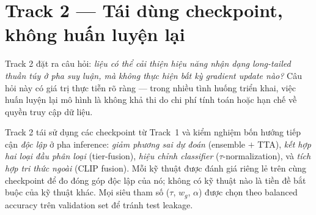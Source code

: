 

\section{Track 2 --- Tái dùng checkpoint, không huấn luyện lại}
\label{sec:track2}

Track 2 đặt ra câu hỏi: \emph{liệu có thể cải thiện hiệu năng nhận dạng long-tailed
thuần túy ở pha suy luận, mà không thực hiện bất kỳ gradient update nào?}
Câu hỏi này có giá trị thực tiễn rõ ràng --- trong nhiều tình huống triển khai,
việc huấn luyện lại mô hình là không khả thi do chi phí tính toán hoặc hạn chế
về quyền truy cập dữ liệu.
 
Track 2 tái sử dụng các checkpoint từ Track~1 và kiểm nghiệm bốn hướng tiếp cận
\emph{độc lập} ở pha inference:
\emph{giảm phương sai dự đoán} (ensemble $+$ TTA),
\emph{kết hợp hai loại đầu phân loại} (tier-fusion),
\emph{hiệu chỉnh classifier} ($\tau$-normalization),
và \emph{tích hợp tri thức ngoài} (CLIP fusion).
Mỗi kỹ thuật được đánh giá riêng lẻ trên cùng checkpoint để đo đóng góp
độc lập của nó; không có kỹ thuật nào là tiền đề bắt buộc của kỹ thuật khác.
Mọi siêu tham số ($\tau$, $w_g$, $\alpha$) được chọn theo balanced accuracy
trên validation set để tránh test leakage.
\medskip


